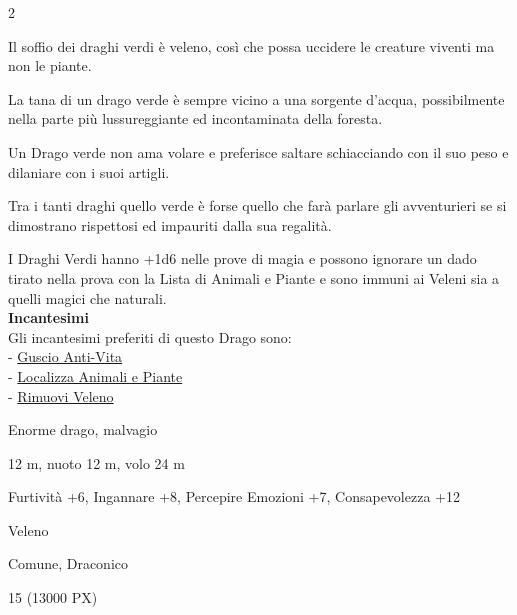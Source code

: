 \begin{multicols}{2}
{Il soffio dei draghi verdi è veleno, così che possa uccidere le creature viventi ma non le piante.

La tana di un drago verde è sempre vicino a una sorgente d'acqua, possibilmente nella parte più lussureggiante ed incontaminata della foresta.

Un Drago verde non ama volare e preferisce saltare schiacciando con il suo peso e dilaniare con i suoi artigli.

Tra i tanti draghi quello verde è forse quello che farà parlare gli avventurieri se si dimostrano rispettosi ed impauriti dalla sua regalità.

I Draghi Verdi hanno +1d6 nelle prove di magia e possono ignorare un dado tirato nella prova con la Lista di Animali e Piante e sono immuni ai Veleni sia a quelli magici che naturali.\\
\textbf{Incantesimi}\\
Gli incantesimi preferiti di questo Drago sono:\\
- \hyperlink{Guscio Anti-Vita}{Guscio Anti-Vita}\\
- \hyperlink{Localizza Animali e Piante}{Localizza Animali e Piante}\\
- \hyperlink{Rimuovi Veleno}{Rimuovi Veleno}

\begin{description}[noitemsep, topsep=0pt, parsep=0pt, partopsep=0pt, itemsep=1pt, leftmargin=2.35cm,  labelwidth=2.2cm, itemindent=0cm, listparindent=0pt] %
\setlength{\baselineskip}{10pt}
\item[\textbf{Taglia/Tipo}] Enorme drago, malvagio
\item[\textbf{Caratt.}] 
\item[\textbf{Punti Ferita}] 
\item[\textbf{Movimento}] 12 m, nuoto 12 m, volo 24 m
\item[\textbf{Tiri Salvez.}] 
\item[\textbf{Comp.}] Furtività +6, Ingannare +8, Percepire Emozioni +7, Consapevolezza +12
\item[\textbf{Imm. Danni}] Veleno
\item[\textbf{Sensi}] 
\item[\textbf{Linguaggi}] Comune, Draconico
\item[\textbf{Sfida}] 15 (13000 PX)
\end{description}
\smallskip

}
\end{multicols}
